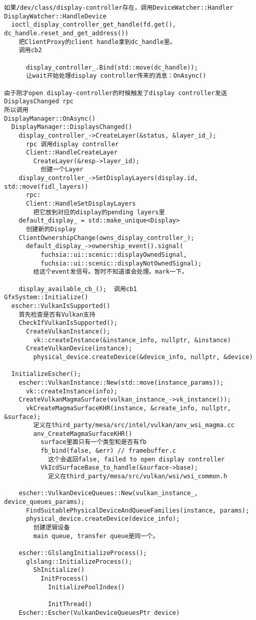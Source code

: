 \begin{verbatim}
如果/dev/class/display-controller存在，调用DeviceWatcher::Handler
DisplayWatcher::HandleDevice
  ioctl_display_controller_get_handle(fd.get(), dc_handle.reset_and_get_address())
    把ClientProxy的client handle拿到dc_handle里。
    调用cb2

      display_controller_.Bind(std::move(dc_handle));
      让wait开始处理display controller传来的消息：OnAsync()

由于刚才open display-controller的时候触发了display controller发送DisplaysChanged rpc
所以调用
DisplayManager::OnAsync()
  DisplayManager::DisplaysChanged()
    display_controller_->CreateLayer(&status, &layer_id_);
      rpc 调用display controller
      Client::HandleCreateLayer
        CreateLayer(&resp->layer_id);
          创建一个Layer
    display_controller_->SetDisplayLayers(display.id, std::move(fidl_layers))
      rpc:
      Client::HandleSetDisplayLayers
        把它放到对应的display的pending layers里
    default_display_ = std::make_unique<Display>
      创建新的Display    
    ClientOwnershipChange(owns_display_controller_);
      default_display_->ownership_event().signal(
          fuchsia::ui::scenic::displayOwnedSignal,
          fuchsia::ui::scenic::displayNotOwnedSignal);
        给这个event发信号。暂时不知道谁会处理。mark一下。

    display_available_cb_();  调用cb1
GfxSystem::Initialize()
  escher::VulkanIsSupported()
    首先检查是否有Vulkan支持
    CheckIfVulkanIsSupported();
      CreateVulkanInstance();
        vk::createInstance(&instance_info, nullptr, &instance)
      CreateVulkanDevice(instance);
        physical_device.createDevice(&device_info, nullptr, &device)

  InitializeEscher();
    escher::VulkanInstance::New(std::move(instance_params));
      vk::createInstance(info);
    CreateVulkanMagmaSurface(vulkan_instance_->vk_instance());
      vkCreateMagmaSurfaceKHR(instance, &create_info, nullptr, &surface);
        定义在third_party/mesa/src/intel/vulkan/anv_wsi_magma.cc
        anv_CreateMagmaSurfaceKHR()
          surface里面只有一个类型和是否有fb
          fb_bind(false, &err) // framebuffer.c
            这个会返回false, failed to open display controller
          VkIcdSurfaceBase_to_handle(&surface->base);
            定义在third_party/mesa/src/vulkan/wsi/wsi_common.h

    escher::VulkanDeviceQueues::New(vulkan_instance_, device_queues_params);
      FindSuitablePhysicalDeviceAndQueueFamilies(instance, params);
      physical_device.createDevice(device_info);
        创建逻辑设备
        main queue, transfer queue是同一个。

    escher::GlslangInitializeProcess();
      glslang::InitializeProcess();
        ShInitialize()
          InitProcess()
            InitializePoolIndex()

            InitThread()
    Escher::Escher(VulkanDeviceQueuesPtr device)
\end{verbatim}